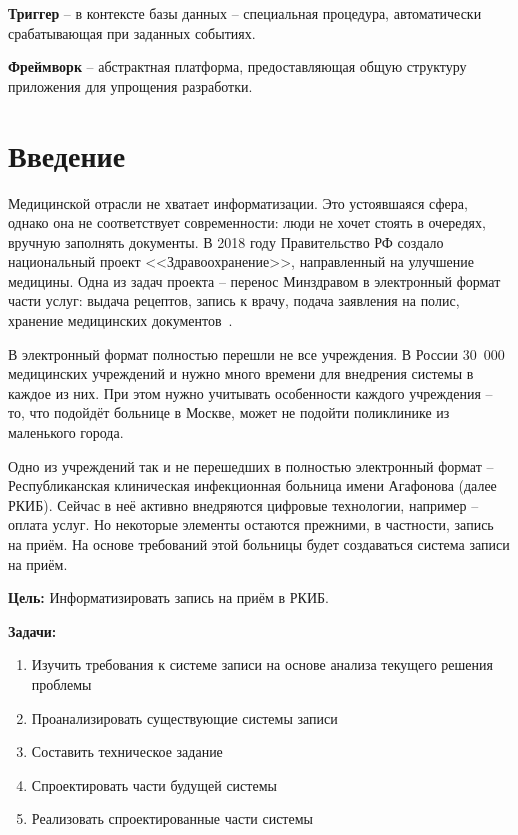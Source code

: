 \documentclass[a4paper,article]{article}
\begin{document}
\begin{sloppypar}
    \textbf{Триггер} -- в контексте базы данных -- специальная процедура, автоматически срабатывающая при заданных событиях.

    \textbf{Фреймворк} -- абстрактная платформа, предоставляющая общую структуру приложения для упрощения разработки.

    \newpage

    \section*{Введение}

        Медицинской отрасли не хватает информатизации. Это устоявшаяся сфера, однако она не соответствует современности: люди не хочет стоять в очередях, вручную заполнять документы. В 2018 году Правительство РФ создало национальный проект <<Здравоохранение>>, направленный на улучшение медицины. Одна из задач проекта -- перенос Минздравом в электронный формат части услуг: выдача рецептов, запись к врачу, подача заявления на полис, хранение медицинских документов~\cite{natsproektzdravoohranenie}.

        В электронный формат полностью перешли не все учреждения. В России 30~000 медицинских учреждений и нужно много времени для внедрения системы в каждое из них. При этом нужно учитывать особенности каждого учреждения -- то, что подойдёт больнице в Москве, может не подойти поликлинике из маленького города.

        Одно из учреждений так и не перешедших в полностью электронный формат -- Республиканская клиническая инфекционная больница имени Агафонова (далее РКИБ). Сейчас в неё активно внедряются цифровые технологии, например -- оплата услуг. Но некоторые элементы остаются прежними, в частности, запись на приём. На основе требований этой больницы будет создаваться система записи на приём.

        \textbf{Цель:} Информатизировать запись на приём в РКИБ.

        \textbf{Задачи:}

        \begin{enumerate}[nolistsep]
            \item Изучить требования к системе записи на основе анализа текущего решения проблемы
            \item Проанализировать существующие системы записи
            \item Составить техническое задание
            \item Спроектировать части будущей системы
            \item Реализовать спроектированные части системы
        \end{enumerate}


\end{sloppypar}
\end{document}
